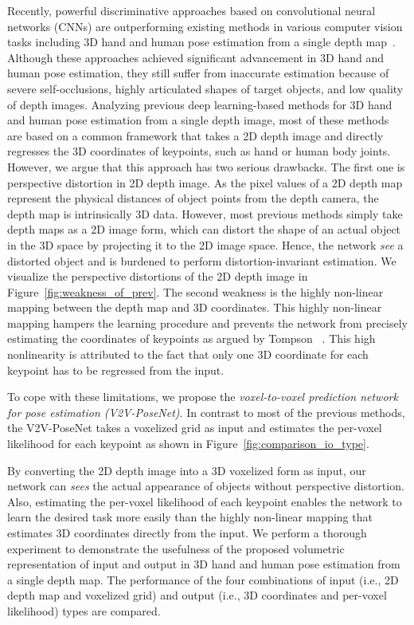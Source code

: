 \documentclass[10pt,twocolumn,letterpaper]{article}
\begin{document}
Recently, powerful discriminative approaches based on convolutional neural networks (CNNs) are outperforming existing methods in various computer vision tasks including 3D hand and human pose estimation from a single depth map~\cite{ge20173d,guo2017towards,Oberweger_2017_ICCV_Workshops,chen2017pose,haque2016towards}. Although these approaches achieved significant advancement in 3D hand and human pose estimation, they still suffer from inaccurate estimation because of severe self-occlusions, highly articulated shapes of target objects, and low quality of depth images. Analyzing previous deep learning-based methods for 3D hand and human pose estimation from a single depth image, most of these methods~\cite{oberweger2015hands,oberweger2015training,bouchacourt2016disco,Wan_2017_CVPR,guo2017ren,guo2017towards,Oberweger_2017_ICCV_Workshops,chen2017pose,madadi2017end,fourure2017multi,haque2016towards} are based on a common framework that takes a 2D depth image and directly regresses the 3D coordinates of keypoints, such as hand or human body joints. However, we argue that this approach has two serious drawbacks. The first one is perspective distortion in 2D depth image. As the pixel values of a 2D depth map represent the physical distances of object points from the depth camera, the depth map is intrinsically 3D data. However, most previous methods simply take depth maps as a 2D image form, which can distort the shape of an actual object in the 3D space by projecting it to the 2D image space. Hence, the network \emph{see} a distorted object and is burdened to perform distortion-invariant estimation. We visualize the perspective distortions of the 2D depth image in Figure~\ref{fig:weakness_of_prev}. The second weakness is the highly non-linear mapping between the depth map and 3D coordinates. This highly non-linear mapping hampers the learning procedure and prevents the network from precisely estimating the coordinates of keypoints as argued by Tompson \etal~\cite{tompson2014joint}. This high nonlinearity is attributed to the fact that only one 3D coordinate for each keypoint has to be regressed from the input.

To cope with these limitations, we propose the \emph{voxel-to-voxel prediction network for pose estimation (V2V-PoseNet)}. In contrast to most of the previous methods, the V2V-PoseNet takes a voxelized grid as input and estimates the per-voxel likelihood for each keypoint as shown in Figure~\ref{fig:comparison_io_type}. 

By converting the 2D depth image into a 3D voxelized form as input, our network can \emph{sees} the actual appearance of objects without perspective distortion. Also, estimating the per-voxel likelihood of each keypoint enables the network to learn the desired task more easily than the highly non-linear mapping that estimates 3D coordinates directly from the input. We perform a thorough experiment to demonstrate the usefulness of the proposed volumetric representation of input and output in 3D hand and human pose estimation from a single depth map. The performance of the four combinations of input (i.e., 2D depth map and voxelized grid) and output (i.e., 3D coordinates and per-voxel likelihood) types are compared.
\end{document}
